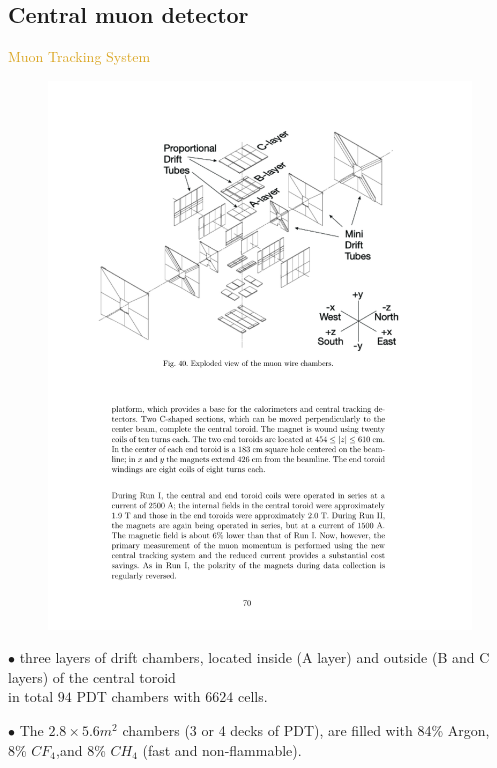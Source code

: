 \subsection{Central muon detector}
\begin{frame}{\textcolor{Goldenrod}{Muon Tracking System}}
  \begin{overlayarea}{\textwidth}{\textheight}
    \begin{figure}[h]
      \centering
      \includegraphics[height=0.4\textheight]{./Images/43_MD_PDT.pdf}
    \end{figure}
    {\small
    \itt
  \item[$\bullet$] 
    three layers of drift chambers, located inside (A layer)
    and outside (B and C layers) of the central toroid\\
    in total $94$ PDT chambers with $6624$ cells.
    
  \item[$\bullet$]
    The $2.8 \times 5.6 m^2$ chambers (3 or 4 decks of PDT), are
    filled with 84\% Argon, 8\% $CF_4$,and 8\% $CH_4$ (fast and
    non-flammable).
    \tti
  }
  \end{overlayarea}
\end{frame}

